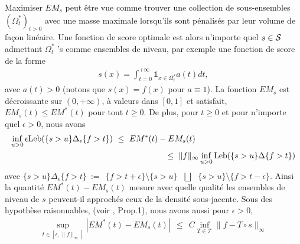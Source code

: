 %
\begin{center}
\label{resume_fr:EMcurve}
\end{center}
%
\noindent
Maximiser $ EM_s $ peut être vue comme trouver une collection de sous-ensembles $ (\Omega ^ * _ t) _ {t> 0} $ avec une masse maximale lorsqu'ils sont pénalisés par leur volume de façon linéaire. Une fonction de score optimale est alors n'importe quel $ s \in \S $ admettant $ \Omega^*_t $ 's comme ensembles de niveau, par exemple une fonction de score de la forme
\begin{align*}
s(x)=\int_{t=0}^{+\infty} \mathds{1}_{x\in \Omega^*_t}a(t)dt,\end{align*}
avec $a(t)>0$ (notons que $s(x)=f(x)$ pour $a \equiv 1$).
%
La fonction $EM_s$ est décroissante sur $(0,+\infty)$, à valeurs dans $[0,1]$ et satisfait, $EM_s(t) \le EM^*(t)$ pour tout $t\geq 0$. 
De plus, pour $t \ge 0$ et pour n'importe quel $\epsilon > 0$, nous avons 
\begin{align*}
\inf_{u>0} \epsilon \leb (\{ s >u\}\Delta_\epsilon \{f>t\}) &~\le~ EM^*(t)-EM_s(t) \\ &~~~~~~~~~~~~~~~~~~~\le~ \|f\|_\infty \inf_{u>0} \leb (\{ s >u\}\Delta\{f>t\})
\end{align*}
avec $\{ s >u\}\Delta_\epsilon \{f>t\} ~:=~~ \{f>t+\epsilon\} \setminus \{ s >u\} ~~~\bigsqcup~~~ \{ s >u\} \setminus \{f>t-\epsilon\}$. Ainsi la quantité $EM^*(t)-EM_s(t)$ mesure avec quelle qualité les ensembles de niveau de $s$ peuvent-il approchés ceux de la densité sous-jacente.
Sous des hypothèse raisonnables, (voir \cite{AISTAT15}, Prop.1), nous avons aussi pour $\epsilon >0$, 
\begin{align*}
\sup_{t\in[\epsilon ,\|f\|_\infty]}|EM^*(t)-EM_s(t)| ~~\le~~  C \inf_{T  \in \mathcal{T}} \|f-T\circ s\|_\infty
\end{align*}

